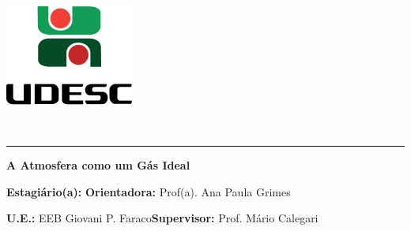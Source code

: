 \documentclass[
12pt,				%
openright,			%
oneside,			%
a4paper,			%
chapter=TITLE,		%
english,			%
brazil				%
]{abntex2}
\begin{document}
\thispagestyle{empty}
\begin{center}
	\begin{minipage}[!]{\linewidth}
		\begin{minipage}[!]{.19\linewidth}
			\includegraphics[width=\linewidth]{img/logo.png}           
		\end{minipage}
		\begin{minipage}[!]{.8\linewidth}
			\center
			\ABNTEXchapterfont\normalsize\MakeUppercase{\imprimirinstituicao}
			\par
			\vspace*{10pt}                     
			\ABNTEXchapterfont\normalsize\MakeUppercase{\centro}
			\par
			\vspace*{10pt}           
			\ABNTEXchapterfont\normalsize\MakeUppercase{\disciplina}
		\end{minipage}        
	\end{minipage}
	\\ \vspace{0.5cm}
	\rule{\textwidth}{.5pt}   
\end{center}
\textual
\begin{center}
	\textbf{A Atmosfera como um Gás Ideal}
\end{center}
\par\noindent\textbf{Estagiário(a):} \imprimirautor\hfill{}\textbf{Orientadora:} Prof(a). Ana Paula Grimes
\par\noindent\textbf{U.E.:} EEB Giovani P. Faraco\hfill{}\textbf{Supervisor:} Prof. Mário Calegari
\end{document}
